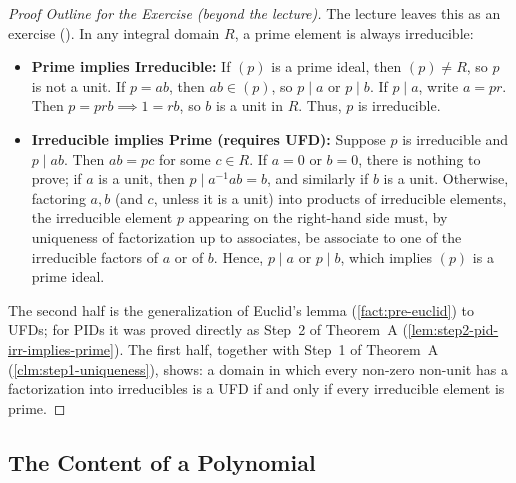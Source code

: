 \begin{content}

\begin{proof}[Proof Outline for the Exercise (beyond the lecture)]
The lecture leaves this as an exercise (). In any integral domain $R$, a prime element is always irreducible:
\begin{itemize}
    \item \textbf{Prime implies Irreducible:} If $(p)$ is a prime ideal, then $(p) \neq R$, so $p$ is not a unit. If $p = ab$, then $ab \in (p)$, so $p \mid a$ or $p \mid b$. If $p \mid a$, write $a = pr$. Then $p = prb \implies 1 = rb$, so $b$ is a unit in $R$. Thus, $p$ is irreducible.
    \item \textbf{Irreducible implies Prime (requires UFD):} Suppose $p$ is irreducible and $p \mid ab$. Then $ab = pc$ for some $c \in R$. If $a = 0$ or $b = 0$, there is nothing to prove; if $a$ is a unit, then $p \mid a^{-1} a b = b$, and similarly if $b$ is a unit. Otherwise, factoring $a, b$ (and $c$, unless it is a unit) into products of irreducible elements, the irreducible element $p$ appearing on the right-hand side must, by uniqueness of factorization up to associates, be associate to one of the irreducible factors of $a$ or of $b$. Hence, $p \mid a$ or $p \mid b$, which implies $(p)$ is a prime ideal.
\end{itemize}
The second half is the generalization of Euclid's lemma (\cref{fact:pre-euclid}) to UFDs; for PIDs it was proved directly as Step~2 of Theorem~A (\cref{lem:step2-pid-irr-implies-prime}). The first half, together with Step~1 of Theorem~A (\cref{clm:step1-uniqueness}), shows: a domain in which every non-zero non-unit has a factorization into irreducibles is a UFD if and only if every irreducible element is prime.
\end{proof}
\end{content}

\subsection{The Content of a Polynomial}

